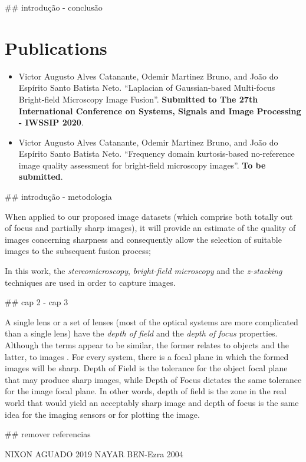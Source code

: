 ## introdução - conclusão

\section*{Publications}

\begin{itemize}
    \item Victor Augusto Alves Catanante, Odemir Martinez Bruno, and João do Espírito Santo Batista Neto. ``Laplacian of Gaussian-based Multi-focus Bright-field Microscopy Image Fusion''. \textbf{Submitted to The 27th International Conference on Systems, Signals and Image Processing - IWSSIP 2020}.
    
    \item \cite{catanante2020frequency} Victor Augusto Alves Catanante, Odemir Martinez Bruno, and João do Espírito Santo Batista Neto. ``Frequency domain kurtosis-based no-reference image quality assessment for bright-field microscopy images''. \textbf{To be submitted}.
\end{itemize}

## introdução - metodologia

When applied to our proposed image datasets (which comprise both totally out of focus and partially sharp images), it will provide an estimate of the quality of images concerning sharpness and consequently allow the selection of suitable images to the subsequent fusion process;

In this work, the \emph{stereomicroscopy}, \emph{bright-field microscopy} and the \emph{z-stacking} techniques are used in order to capture images.

## cap 2 - cap 3

A single lens or a set of lenses (most of the optical systems are more complicated than a single lens) have the \emph{depth of field} and the \emph{depth of focus} properties. Although the terms appear to be similar, the former relates to objects and the latter, to images \cite{davidson2002optical}. For every system, there is a focal plane in which the formed images will be sharp. Depth of Field is the tolerance for the object focal plane that may produce sharp images, while Depth of Focus dictates the same tolerance for the image focal plane. In other words, depth of field is the zone in the real world that would yield an acceptably sharp image and depth of focus is the same idea for the imaging sensors or for plotting the image.

## remover referencias

NIXON AGUADO 2019
NAYAR BEN-Ezra 2004
